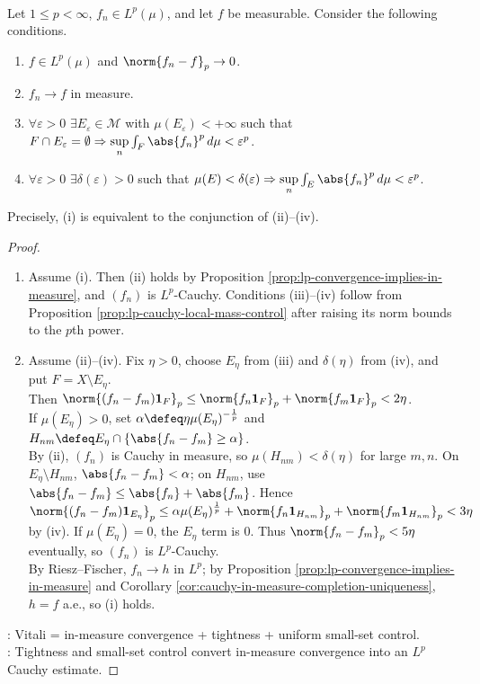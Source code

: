 \begin{theorem} \label{thm:vitali-convergence-lp} \\
Let $1\leq p<\infty$, $f_n\in L^p(\mu)$, and let $f$ be measurable. Consider the following conditions.
\begin{enumerate}[label=(\roman*)]
\setlength{\itemsep}{0pt}
\item $f\in L^p(\mu)$ and $\norm{f_n-f}_p\to0$.
\item $f_n\to f$ in measure.
\item $\forall\varepsilon>0$ $\exists E_\varepsilon\in\mathcal{M}$ with $\mu(E_\varepsilon)<+\infty$ such that $F\cap E_\varepsilon=\emptyset\Rightarrow\sup\limits_n\int_F\abs{f_n}^p\,d\mu<\varepsilon^p$.
\item $\forall\varepsilon>0$ $\exists\delta(\varepsilon)>0$ such that $\mu(E)<\delta(\varepsilon)\Rightarrow\sup\limits_n\int_E\abs{f_n}^p\,d\mu<\varepsilon^p$.
\end{enumerate}
Precisely, (i) is equivalent to the conjunction of (ii)--(iv).
\begin{proof}
\begin{enumerate}[label=(\roman*)]
\setlength{\itemsep}{0pt}
\item Assume (i). Then (ii) holds by Proposition \ref{prop:lp-convergence-implies-in-measure}, and $(f_n)$ is $L^p$-Cauchy. Conditions (iii)--(iv) follow from Proposition \ref{prop:lp-cauchy-local-mass-control} after raising its norm bounds to the $p$th power.
\item Assume (ii)--(iv). Fix $\eta>0$, choose $E_\eta$ from (iii) and $\delta(\eta)$ from (iv), and put $F=X\setminus E_\eta$.\\
Then $\norm{(f_n-f_m)\mathbf{1}_F}_p\leq\norm{f_n\mathbf{1}_F}_p+\norm{f_m\mathbf{1}_F}_p<2\eta$.\\
If $\mu(E_\eta)>0$, set $\alpha\defeq\eta\mu(E_\eta)^{-\frac{1}{p}}$ and $H_{nm}\defeq E_\eta\cap\{\abs{f_n-f_m}\geq\alpha\}$.\\
By (ii), $(f_n)$ is Cauchy in measure, so $\mu(H_{nm})<\delta(\eta)$ for large $m,n$. On $E_\eta\setminus H_{nm}$, $\abs{f_n-f_m}<\alpha$; on $H_{nm}$, use $\abs{f_n-f_m}\leq\abs{f_n}+\abs{f_m}$. Hence $\norm{(f_n-f_m)\mathbf{1}_{E_\eta}}_p\leq\alpha\mu(E_\eta)^{\frac{1}{p}}+\norm{f_n\mathbf{1}_{H_{nm}}}_p+\norm{f_m\mathbf{1}_{H_{nm}}}_p<3\eta$ by (iv). If $\mu(E_\eta)=0$, the $E_\eta$ term is $0$. Thus $\norm{f_n-f_m}_p<5\eta$ eventually, so $(f_n)$ is $L^p$-Cauchy.\\
By Riesz--Fischer, $f_n\to h$ in $L^p$; by Proposition \ref{prop:lp-convergence-implies-in-measure} and Corollary \ref{cor:cauchy-in-measure-completion-uniqueness}, $h=f$ a.e., so (i) holds.
\end{enumerate}
: Vitali = in-measure convergence + tightness + uniform small-set control.\\
: Tightness and small-set control convert in-measure convergence into an $L^p$ Cauchy estimate.
\end{proof}
\end{theorem}
